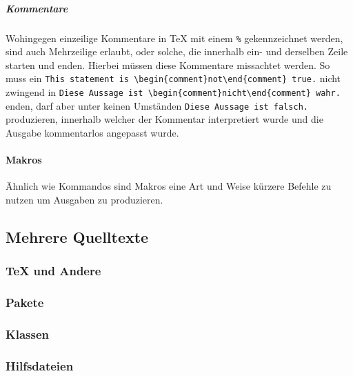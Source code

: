 \subparagraph*{Kommentare}\par
Wohingegen einzeilige Kommentare in \TeX{} mit einem \verb"%" gekennzeichnet werden, sind auch Mehrzeilige erlaubt, oder solche, die innerhalb ein- und derselben Zeile starten und enden. Hierbei müssen diese Kommentare missachtet werden. So muss ein \verb|This statement is \begin{comment}not\end{comment} true.| nicht zwingend in \verb|Diese Aussage ist \begin{comment}nicht\end{comment} wahr.| enden, darf aber unter keinen Umständen \verb|Diese Aussage ist falsch.| produzieren, innerhalb welcher der Kommentar interpretiert wurde und die Ausgabe kommentarlos angepasst wurde.

\paragraph*{Makros}\par
Ähnlich wie Kommandos sind Makros eine Art und Weise kürzere Befehle zu nutzen um Ausgaben zu produzieren.%


\subsection{Mehrere Quelltexte}
\subsubsection{\TeX{} und Andere}
\subsubsection{Pakete}


\subsubsection{Klassen}


\subsubsection{Hilfsdateien}

